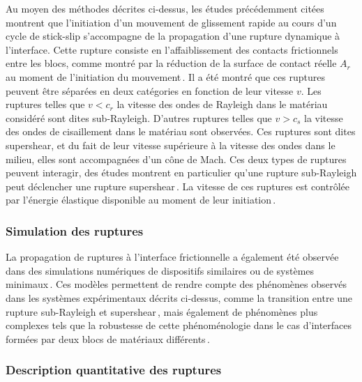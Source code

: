 Au moyen des méthodes décrites ci-dessus, les études précédemment citées montrent que l'initiation d'un mouvement de glissement rapide au cours d'un cycle de stick-slip s'accompagne de la propagation d'une rupture dynamique à l'interface. Cette rupture consiste en l'affaiblissement des contacts frictionnels entre les blocs, comme montré par la réduction de la surface de contact réelle $A_r$ au moment de l'initiation du mouvement\,\cite{svetlizky_brittle_2019}. Il a été montré que ces ruptures peuvent être séparées en deux catégories en fonction de leur vitesse $v$. Les ruptures telles que $v<c_r$ la vitesse des ondes de Rayleigh dans le matériau considéré sont dites sub-Rayleigh. D'autres ruptures telles que $v>c_s$ la vitesse des ondes de cisaillement dans le matériau sont observées. Ces ruptures sont dites supershear, et du fait de leur vitesse supérieure à la vitesse des ondes dans le milieu, elles sont accompagnées d'un cône de Mach. Ces deux types de ruptures peuvent interagir, des études montrent en particulier qu'une rupture sub-Rayleigh peut déclencher une rupture supershear\,\cite{xia_laboratory_2004, schubnel_photo-acoustic_2011,passelegue_sub-rayleigh_2013}. La vitesse de ces ruptures est contrôlée par l'énergie élastique disponible au moment de leur initiation\,\cite{svetlizky_brittle_2017}.




\subsubsection{Simulation des ruptures}


La propagation de ruptures à l'interface frictionnelle a également été observée dans des simulations numériques de dispositifs similaires ou de systèmes minimaux\,\cite{radiguet_survival_2013, barras_study_2014, tromborg_slow_2014, amundsen_steady-state_2015, thogersen_minimal_2019}. Ces modèles permettent de rendre compte des phénomènes observés dans les systèmes expérimentaux décrits ci-dessus, comme la transition entre une rupture sub-Rayleigh et supershear\,\cite{passelegue_sub-rayleigh_2013,kammer_equation_2018, svetlizky_dynamic_2020}, mais également de phénomènes plus complexes tels que la robustesse de cette phénoménologie dans le cas d'interfaces formées par deux blocs de matériaux différents\,\cite{barras_study_2014,bar-sinai_slow_2012}.


\subsubsection{Description quantitative des ruptures}



